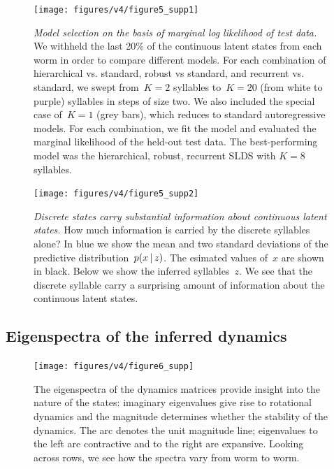 \documentclass[11pt]{article}
\begin{document}
\begin{figure}[t!]
\centering%
\texttt{[image: figures/v4/figure5\_supp1]} 
\caption{\textit{Model selection on the basis of marginal log
    likelihood of test data.}  We withheld the last 20\% of the
  continuous latent states from each worm in order to compare
  different models.  For each combination of hierarchical
  vs. standard, robust vs standard, and recurrent vs. standard, we
  swept from~$K=2$ syllables to~$K=20$ (from white to purple)
  syllables in steps of size two. We also included the special case
  of~$K=1$ (grey bars), which reduces to standard autoregressive
  models. For each combination, we fit the model and evaluated the
  marginal likelihood of the held-out test data. The best-performing
  model was the hierarchical, robust, recurrent SLDS with $K=8$
  syllables.}
\label{fig:model_selection}
\end{figure}

\begin{figure}[t!]
\centering%
\texttt{[image: figures/v4/figure5\_supp2]} 
\caption{\textit{Discrete states carry substantial information about
    continuous latent states.} How much information is carried by the
  discrete syllables alone? In blue we show the mean and two standard deviations of
  the predictive distribution~$p(x \,|\, z)$.  The esimated values of~$x$
  are shown in black. Below we show the inferred syllables~$z$. We see that
  the discrete syllable carry a surprising amount of information about the continuous
  latent states.}
\label{fig:z_predictions}
\end{figure}


\subsection{Eigenspectra of the inferred dynamics}
\begin{figure}[t!]
\centering%
\texttt{[image: figures/v4/figure6\_supp]} 
\caption{The eigenspectra of the dynamics matrices
    provide insight into the nature of the states: imaginary eigenvalues
    give rise to rotational dynamics and the magnitude determines
    whether the stability of the dynamics. The arc denotes
    the unit magnitude line; eigenvalues to the left are contractive
    and to the right are expansive. Looking across rows, we
    see how the spectra vary from worm to worm. 
}
\label{fig:eigen}
\end{figure}
\end{document}
